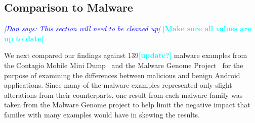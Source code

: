 \documentclass{sig-alternate}
\newcommand{\todo}[1]{\textcolor{cyan}{\textbf{[#1]}}}
\newcommand{\dan}[1]{\textcolor{blue}{{\it [Dan says: #1]}}}
\begin{document}


















\subsection{Comparison to Malware}

\dan{This section will need to be cleaned up}
\todo{Make sure all values are up to date}

We next compared our findings against 139\todo{update?} malware examples from the Contagio Mobile Mini Dump~\cite{contagio_url} and the Malware Genome Project~\cite{Zhou:2012:DAM:2310656.2310710} for the purpose of examining the differences between malicious and benign Android applications. Since many of the malware examples represented only slight alterations from their counterparts, one result from each malware family was taken from the Malware Genome project to help limit the negative impact that familes with many examples would have in skewing the results.
\end{document}
